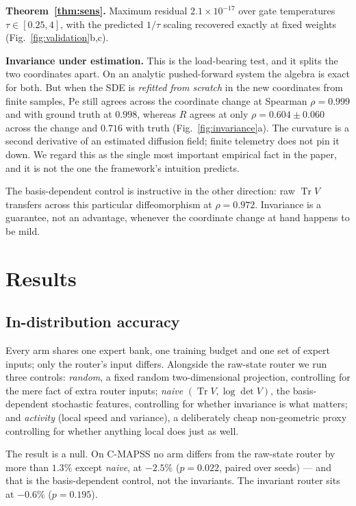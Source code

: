 \documentclass[11pt]{article}
\newcommand{\Pen}{\mathrm{Pe}}
\newcommand{\Trr}{\operatorname{Tr}}
\begin{document}
\textbf{Theorem~\ref{thm:sens}.} Maximum residual $2.1\times10^{-17}$ over gate
temperatures $\tau\in[0.25,4]$, with the predicted $1/\tau$ scaling recovered
exactly at fixed weights (Fig.~\ref{fig:validation}b,c).

\textbf{Invariance under estimation.} This is the load-bearing test, and it
splits the two coordinates apart. On an analytic pushed-forward system the
algebra is exact for both. But when the SDE is \emph{refitted from scratch} in
the new coordinates from finite samples, $\Pen$ still agrees across the
coordinate change at Spearman $\rho=0.999$ and with ground truth at $0.998$,
whereas $R$ agrees at only $\rho=0.604\pm0.060$ across the change and $0.716$
with truth (Fig.~\ref{fig:invariance}a). The curvature is a second derivative
of an estimated diffusion field; finite telemetry does not pin it down. We
regard this as the single most important empirical fact in the paper, and it is
not the one the framework's intuition predicts.

The basis-dependent control is instructive in the other direction: raw
$\Trr V$ transfers across this particular diffeomorphism at $\rho=0.972$.
Invariance is a guarantee, not an advantage, whenever the coordinate change at
hand happens to be mild.

\section{Results}
\label{sec:results}

\subsection{In-distribution accuracy}

Every arm shares one expert bank, one training budget and one set of expert
inputs; only the router's input differs. Alongside the raw-state router we run
three controls: \emph{random}, a fixed random two-dimensional projection,
controlling for the mere fact of extra router inputs; \emph{naive}
$(\Trr V,\log\det V)$, the basis-dependent stochastic features, controlling for
whether invariance is what matters; and \emph{activity} (local speed and
variance), a deliberately cheap non-geometric proxy controlling for whether
anything local does just as well.


The result is a null. On C-MAPSS no arm differs from the raw-state router by
more than $1.3\%$ except \emph{naive}, at $-2.5\%$ ($p=0.022$, paired over
seeds) --- and that is the basis-dependent control, not the invariants. The
invariant router sits at $-0.6\%$ ($p=0.195$).
\end{document}
